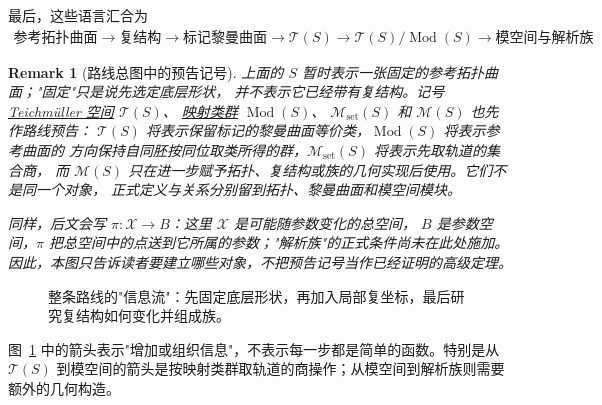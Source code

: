 \documentclass[UTF8,a4paper,11pt]{article}
\theoremstyle{foundation-definition}
\theoremstyle{foundation-theorem}
\theoremstyle{foundation-proposition}
\theoremstyle{foundation-example}
\theoremstyle{foundation-remark}
\newtheorem{remark}[definition]{Remark}
\theoremstyle{foundation-theorem}
\newcommand{\T}{\mathcal T}
\newcommand{\M}{\mathcal M}
\newcommand{\Mod}{\operatorname{Mod}}
\newcommand{\term}[2]{\hyperref[#1]{#2}}
\begin{document}
最后，这些语言汇合为
\[
\begin{gathered}
\text{参考拓扑曲面}
\longrightarrow
\text{复结构}
\longrightarrow
\text{标记黎曼曲面}
\longrightarrow
\T(S)
\longrightarrow
\T(S)/\Mod(S)
\longrightarrow
\text{模空间与解析族}
\end{gathered}
\]

\begin{remark}[路线总图中的预告记号]\label{rem:roadmap-notation}
上面的 \(S\) 暂时表示一张固定的参考拓扑曲面；"固定"只是说先选定底层形状，
并不表示它已经带有复结构。记号
\term{def:teich}{Teichmüller 空间} \(\T(S)\)、
\term{def:mapping-class}{映射类群} \(\Mod(S)\)、
\(\M_{\mathrm{set}}(S)\) 和 \(\M(S)\) 也先作路线预告：
\(\T(S)\) 将表示保留标记的黎曼曲面等价类，\(\Mod(S)\) 将表示参考曲面的
方向保持自同胚按同位取类所得的群，\(\M_{\mathrm{set}}(S)\) 将表示先取轨道的集合商，
而 \(\M(S)\) 只在进一步赋予拓扑、复结构或族的几何实现后使用。它们不是同一个对象，
正式定义与关系分别留到拓扑、黎曼曲面和模空间模块。

同样，后文会写 \(\pi:\mathcal X\to B\)：这里 \(\mathcal X\) 是可能随参数变化的总空间，
\(B\) 是参数空间，\(\pi\) 把总空间中的点送到它所属的参数；"解析族"的正式条件尚未在此处施加。
因此，本图只告诉读者要建立哪些对象，不把预告记号当作已经证明的高级定理。
\end{remark}

\begin{figure}[htbp]
\centering
{}
\caption{整条路线的"信息流"：先固定底层形状，再加入局部复坐标，最后研究复结构如何变化并组成族。}
\label{fig:route-overview}
\end{figure}

图~\ref{fig:route-overview} 中的箭头表示"增加或组织信息"，不表示每一步都是简单的函数。特别是从 \(\T(S)\) 到模空间的箭头是按映射类群取轨道的商操作；从模空间到解析族则需要额外的几何构造。
\end{document}
